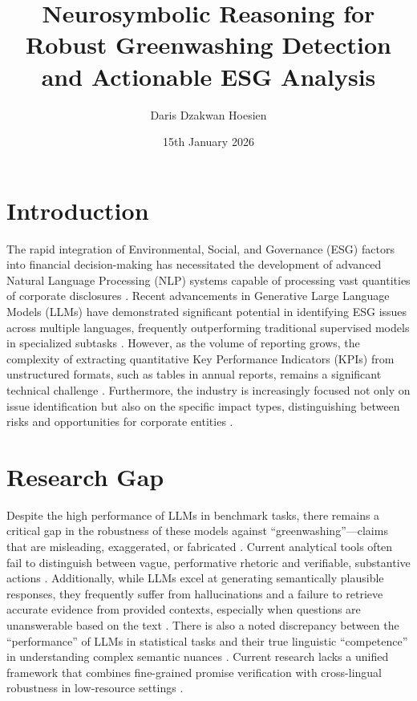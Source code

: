 \documentclass{article}
\title{Neurosymbolic Reasoning for Robust Greenwashing Detection and Actionable ESG Analysis}
\author{Daris Dzakwan Hoesien}
\date{15th January 2026}
\begin{document}
\maketitle

\section{Introduction}
The rapid integration of Environmental, Social, and Governance (ESG) factors into financial decision-making has necessitated the development of advanced Natural Language Processing (NLP) systems capable of processing vast quantities of corporate disclosures \citep{chen-etal-2023-multi-lingual}. Recent advancements in Generative Large Language Models (LLMs) have demonstrated significant potential in identifying ESG issues across multiple languages, frequently outperforming traditional supervised models in specialized subtasks \citep{lee-etal-2023-easyguide, pontes-etal-2023-leveraging}. However, as the volume of reporting grows, the complexity of extracting quantitative Key Performance Indicators (KPIs) from unstructured formats, such as tables in annual reports, remains a significant technical challenge \citep{mishra-etal-2024-statements}. Furthermore, the industry is increasingly focused not only on issue identification but also on the specific impact types, distinguishing between risks and opportunities for corporate entities \citep{chen-etal-2023-multi-lingual-esg, mishra-2023-esg}.

\section{Research Gap}
Despite the high performance of LLMs in benchmark tasks, there remains a critical gap in the robustness of these models against ``greenwashing''—claims that are misleading, exaggerated, or fabricated \citep{ong-etal-2025-towards-robust}. Current analytical tools often fail to distinguish between vague, performative rhetoric and verifiable, substantive actions \citep{ong-etal-2025-towards-robust}. Additionally, while LLMs excel at generating semantically plausible responses, they frequently suffer from hallucinations and a failure to retrieve accurate evidence from provided contexts, especially when questions are unanswerable based on the text \citep{henning-etal-2023-answer}. There is also a noted discrepancy between the ``performance'' of LLMs in statistical tasks and their true linguistic ``competence'' in understanding complex semantic nuances \citep{he-etal-2025-large-language}. Current research lacks a unified framework that combines fine-grained promise verification with cross-lingual robustness in low-resource settings \citep{huang-etal-2025-multilingual-promise, vardhan-etal-2023-low}.
\end{document}
